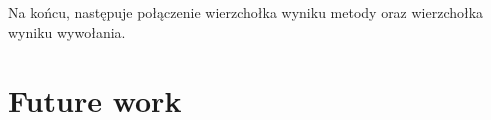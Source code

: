 \documentclass[declaration,shortabstract]{iithesis}
\begin{document}
Na końcu, następuje połączenie wierzchołka wyniku metody oraz wierzchołka wyniku wywołania.




\section{Future work}




\end{document}

